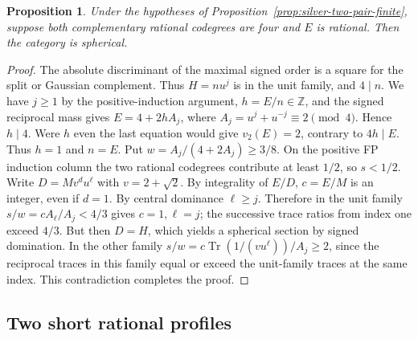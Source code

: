 \documentclass[11pt,reqno]{amsart}
\newtheorem{proposition}[theorem]{Proposition}
\theoremstyle{remark}\newtheorem{remark}[theorem]{Remark}
\numberwithin{equation}{section}
\begin{document}
\begin{proposition}\label{prop:silver-four-rational-E}
Under the hypotheses of Proposition~\ref{prop:silver-two-pair-finite}, suppose both complementary rational codegrees are four and $E$ is rational. Then the category is spherical.
\end{proposition}
\begin{proof}
The absolute discriminant of the maximal signed order is a square for the split or Gaussian complement. Thus $H=nu^j$ is in the unit family, and $4\mid n$. We have $j\ge1$ by the positive-induction argument, $h=E/n\in\mathbb Z$, and the signed reciprocal mass gives $E=4+2hA_j$, where $A_j=u^j+u^{-j}\equiv2\pmod4$. Hence $h\mid4$. Were $h$ even the last equation would give $v_2(E)=2$, contrary to $4h\mid E$. Thus $h=1$ and $n=E$. Put $w=A_j/(4+2A_j)\ge3/8$. On the positive FP induction column the two rational codegrees contribute at least $1/2$, so $s<1/2$. Write $D=Mv^d u^\ell$ with $v=2+\sqrt2$. By integrality of $E/D$, $c=E/M$ is an integer, even if $d=1$. By central dominance $\ell\ge j$. Therefore in the unit family $s/w=cA_\ell/A_j<4/3$ gives $c=1,\ell=j$; the successive trace ratios from index one exceed $4/3$. But then $D=H$, which yields a spherical section by signed domination. In the other family $s/w=c\operatorname{Tr}(1/(vu^\ell))/A_j\ge2$, since the reciprocal traces in this family equal or exceed the unit-family traces at the same index. This contradiction completes the proof.
\end{proof}

\subsection{Two short rational profiles}
\end{document}
